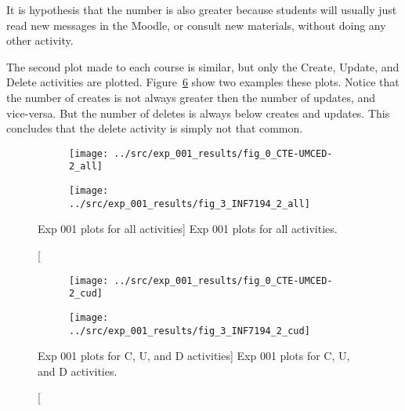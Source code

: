 It is hypothesis that the number is also greater because students will usually
just read new messages in the Moodle, or consult new materials, without doing
any other activity.

The second plot made to each course is similar, but only the Create, Update,
and Delete activities are plotted. Figure~\ref{fig:exp_001_cud} show two
examples these plots. Notice that the number of creates is not always greater
then the number of updates, and vice-versa. But the number of deletes is always
below creates and updates. This concludes that the delete activity is simply
not that common.

\begin{figure}[h!]
    \centering

    \begin{subfigure}{.5\textwidth}
        \centering
        \texttt{[image: ../src/exp\_001\_results/fig\_0\_CTE-UMCED-2\_all]}
        \label{subfig:exp_001_0_all}
    \end{subfigure}%
    \begin{subfigure}{.5\textwidth}
        \centering
        \texttt{[image: ../src/exp\_001\_results/fig\_3\_INF7194\_2\_all]}
        \label{subfig:exp_001_3_all}
    \end{subfigure}

    \caption
        [Exp 001 plots for all activities]
        {Exp 001 plots for all activities.}

    \label{fig:exp_001_all}
\end{figure}

\begin{figure}[h!]
    \centering

    \begin{subfigure}{.5\textwidth}
        \centering
        \texttt{[image: ../src/exp\_001\_results/fig\_0\_CTE-UMCED-2\_cud]}
        \label{subfig:exp_001_0_cud}
    \end{subfigure}%
    \begin{subfigure}{.5\textwidth}
        \centering
        \texttt{[image: ../src/exp\_001\_results/fig\_3\_INF7194\_2\_cud]}
        \label{subfig:exp_001_3_cud}
    \end{subfigure}

    \caption
        [Exp 001 plots for C, U, and D activities]
        {Exp 001 plots for C, U, and D activities.}

    \label{fig:exp_001_cud}
\end{figure}
